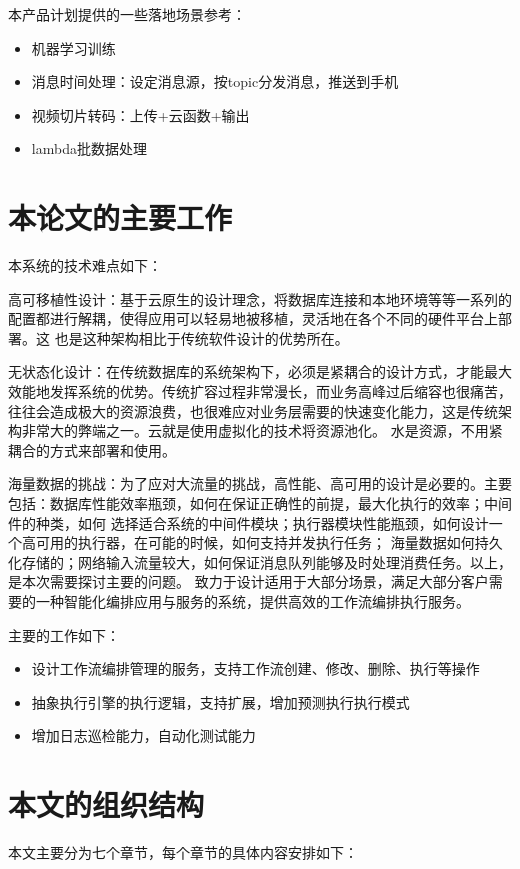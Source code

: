 本产品计划提供的一些落地场景参考：

    \begin{itemize}
        \item 机器学习训练
        \item 消息时间处理：设定消息源，按topic分发消息，推送到手机
        \item 视频切片转码：上传+云函数+输出
        \item lambda批数据处理
    \end{itemize}



\section{本论文的主要工作}

本系统的技术难点如下：

高可移植性设计：基于云原生的设计理念，将数据库连接和本地环境等等一系列的配置都进行解耦，使得应用可以轻易地被移植，灵活地在各个不同的硬件平台上部署。这
也是这种架构相比于传统软件设计的优势所在\cite{othe2}。

无状态化设计：在传统数据库的系统架构下，必须是紧耦合的设计方式，才能最大效能地发挥系统的优势。传统扩容过程非常漫长，而业务高峰过后缩容也很痛苦，
往往会造成极大的资源浪费，也很难应对业务层需要的快速变化能力，这是传统架构非常大的弊端之一\cite{kube2021near}。云就是使用虚拟化的技术将资源池化。
水是资源，不用紧耦合的方式来部署和使用\cite{roberson2021dbspdrp}。

海量数据的挑战：为了应对大流量的挑战，高性能、高可用的设计是必要的。主要包括：数据库性能效率瓶颈，如何在保证正确性的前提，最大化执行的效率；中间件的种类，如何
选择适合系统的中间件模块；执行器模块性能瓶颈，如何设计一个高可用的执行器，在可能的时候，如何支持并发执行任务；
海量数据如何持久化存储的；网络输入流量较大，如何保证消息队列能够及时处理消费任务。以上，是本次需要探讨主要的问题。
致力于设计适用于大部分场景，满足大部分客户需要的一种智能化编排应用与服务的系统，提供高效的工作流编排执行服务。

主要的工作如下：
\begin{itemize}
    \item 设计工作流编排管理的服务，支持工作流创建、修改、删除、执行等操作
    \item 抽象执行引擎的执行逻辑，支持扩展，增加预测执行执行模式
    \item 增加日志巡检能力，自动化测试能力
\end{itemize}

\section{本文的组织结构}
本文主要分为七个章节，每个章节的具体内容安排如下：

